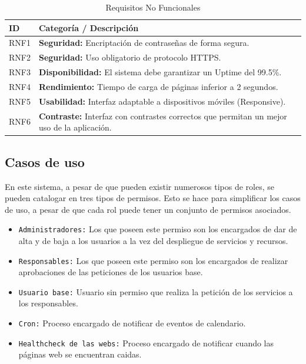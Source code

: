 \begin{longtable}{lp{10cm}}
\caption{Requisitos No Funcionales}
\label{tab:rnf_inc2} \\
\toprule
\textbf{ID} & \textbf{Categoría / Descripción} \\
\midrule
RNF1 & \textbf{Seguridad:} Encriptación de contraseñas de forma segura. \\
RNF2 & \textbf{Seguridad:} Uso obligatorio de protocolo HTTPS. \\
RNF3 & \textbf{Disponibilidad:} El sistema debe garantizar un Uptime del 99.5\%. \\
RNF4 & \textbf{Rendimiento:} Tiempo de carga de páginas inferior a 2 segundos. \\
RNF5 & \textbf{Usabilidad:} Interfaz adaptable a dispositivos móviles (Responsive). \\
RNF6 & \textbf{Contraste:} Interfaz con contrastes correctos que permitan un mejor uso de la aplicación. \\
\bottomrule
\end{longtable}



\subsection{Casos de uso}

En este sistema, a pesar de que pueden existir numerosos tipos de roles, se pueden catalogar en tres tipos de permisos. Esto se hace para simplificar los casos de uso, a pesar de que cada rol puede tener un conjunto de permisos asociados.

\begin{itemize}
  \item \texttt{Administradores:} Los que poseen este permiso son los encargados de dar de alta y de baja a los usuarios a la vez del despliegue de servicios y recursos.

  \item \texttt{Responsables:} Los que poseen este permiso son los encargados de realizar aprobaciones de las peticiones de los usuarios base.

  \item \texttt{Usuario base:} Usuario sin permiso que realiza la petición de los servicios a los responsables. 

  \item \texttt{Cron:}  Proceso encargado de notificar de eventos de calendario.

  \item \texttt{Healthcheck de las webs:} Proceso encargado de notificar cuando las páginas web se encuentran caidas.
\end{itemize}

